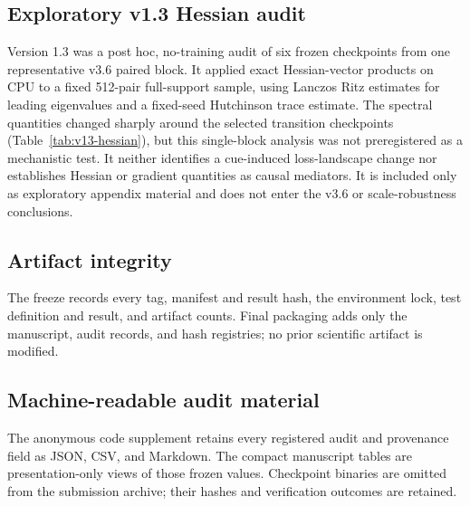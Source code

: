 \documentclass{article}
\begin{document}



\subsection{Exploratory v1.3 Hessian audit}
Version 1.3 was a post hoc, no-training audit of six frozen checkpoints from
one representative v3.6 paired block. It applied exact Hessian-vector products
on CPU to a fixed 512-pair full-support sample, using Lanczos Ritz estimates
for leading eigenvalues and a fixed-seed Hutchinson trace estimate. The
spectral quantities changed sharply around the selected transition
checkpoints (Table~\ref{tab:v13-hessian}), but this single-block analysis was
not preregistered as a mechanistic test. It neither identifies a cue-induced
loss-landscape change nor establishes Hessian or gradient quantities as causal
mediators. It is included only as exploratory appendix material and does not
enter the v3.6 or scale-robustness conclusions.

\clearpage


\subsection{Artifact integrity}
The freeze records every tag, manifest and result hash, the environment lock,
test definition and result, and artifact counts. Final packaging adds only the
manuscript, audit records, and hash registries; no prior scientific artifact is
modified.

\subsection{Machine-readable audit material}
The anonymous code supplement retains every registered audit and provenance
field as JSON, CSV, and Markdown. The compact manuscript tables are
presentation-only views of those frozen values. Checkpoint binaries are
omitted from the submission archive; their hashes and verification outcomes
are retained.
\end{document}
